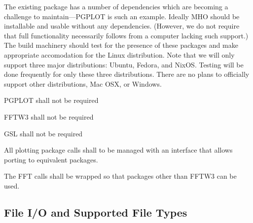The existing package has a number of dependencies which are becoming
a challenge to maintain---\acs{PGPLOT} is such an example.  Ideally
\acs{MHO} should be installable and usable without any dependencies.
(However, we do not require that full functionality necessarily follows
from a computer lacking such support.)  The build machinery should test
for the presence of these packages and make appropriate accomodation for
the Linux distribution. Note that we will only support three major distributions:
Ubuntu, Fedora, and NixOS. Testing will be done frequently for only these
three distributions. There are no plans to officially support other 
distributions, Mac OSX, or Windows.

\begin{description}

 \acs{PGPLOT} shall not be required

 \acs{FFTW3} shall not be required
    
 \acs{GSL} shall not be required
    
 All plotting package calls shall to be managed with an interface 
that allows porting to equivalent packages.
    
 The \ac{FFT} calls shall be wrapped so that packages other than
    \acs{FFTW3} can be used.
    
\end{description}






\subsection{File I/O and Supported File Types}
\label{sec:ioreq}

